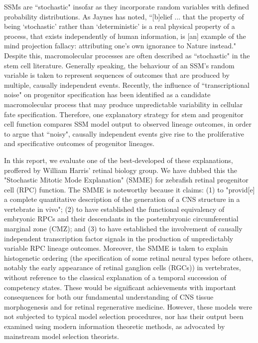 SSMs are ``stochastic" insofar as they incorporate random variables with defined probability distributions. As Jaynes has noted, ``[b]elief ... that the property of being ‘stochastic' rather than ‘deterministic' is a real physical property of a process, that exists independently of human information, is [an] example of the mind projection fallacy: attributing one’s own ignorance to Nature instead."\cite{Jaynes2003} Despite this, macromolecular processes are often described as ``stochastic" in the stem cell literature. Generally speaking, the behaviour of an SSM's random variable is taken to represent sequences of outcomes that are produced by multiple, causally independent events. Recently, the influence of ``transcriptional noise" on progenitor specification has been identified as a candidate macromolecular process that may produce unpredictable variability in cellular fate specification. Therefore, one explanatory strategy for stem and progenitor cell function compares SSM model output to observed lineage outcomes, in order to argue that ``noisy", causally independent events give rise to the proliferative and specificative outcomes of progenitor lineages.

In this report, we evaluate one of the best-developed of these explanations, proffered by William Harris' retinal biology group. We have dubbed this the "Stochastic Mitotic Mode Explanation" (SMME) for zebrafish retinal progenitor cell (RPC) function. The SMME is noteworthy because it claims: (1) to "provid[e] a complete quantitative description of the generation of a CNS structure in a vertebrate in vivo"\cite{He2012}; (2) to have established the functional equivalency of embryonic RPCs and their descendants in the postembryonic circumferential marginal zone (CMZ)\cite{Wan2016}; and (3) to have established the involvement of causally independent transcription factor signals in the production of unpredictably variable RPC lineage outcomes\cite{Boije2015}. Moreover, the SMME is taken to explain histogenetic ordering (the specification of some retinal neural types before others, notably the early appearance of retinal ganglion cells (RGCs)) in vertebrates, without reference to the classical explanation of a temporal succession of competency states\cite{Temple1986}. These would be significant achievements with important consequences for both our fundamental understanding of CNS tissue morphogenesis and for retinal regenerative medicine. However, these models were not subjected to typical model selection procedures, nor has their output been examined using modern information theoretic methods, as advocated by mainstream model selection theorists\cite{Burnham2002}.

